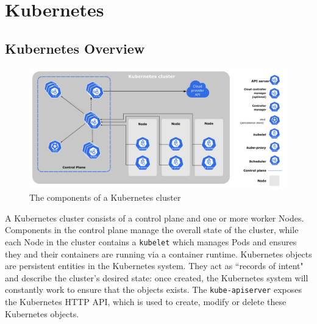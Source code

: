 \section{Kubernetes}

\subsection{Kubernetes Overview}

\begin{figure}[ht!]
    \centering
    \includegraphics[width=\textwidth]{images/components-of-kubernetes.pdf}
    \caption{The components of a Kubernetes cluster~\cite{kubernetes-components}}
    \label{kube-components}
\end{figure}

A Kubernetes cluster consists of a control plane and one or more worker Nodes.
Components in the control plane manage the overall state of the cluster, while
each Node in the cluster contains a \verb|kubelet| which manages Pods and
ensures they and their containers are running via a container runtime.
Kubernetes objects are persistent entities in the Kubernetes system. They act as
``records of intent" and describe the cluster's desired state: once created, the
Kubernetes system will constantly work to ensure that the objects exists. The
\verb|kube-apiserver| exposes the Kubernetes HTTP API, which is used to create,
modify or delete these Kubernetes objects.

